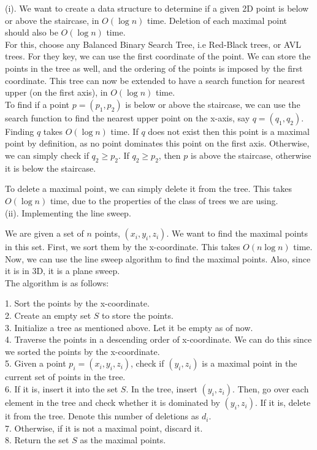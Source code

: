 \documentclass[a4paper]{article}
\begin{document}
\begin{enumerate}
    (i). We want to create a data structure to determine if a given 2D point is below or above the staircase, in $O(\log n)$ time. Deletion of each maximal point should also be $O(\log n)$ time.\\
    For this, choose any Balanced Binary Search Tree, i.e Red-Black trees, or AVL trees. For they key, we can use the first coordinate of the point. We can store the points in the tree as well, and the ordering of the points is imposed by the first coordinate. This tree can now be extended to have a search function for nearest upper (on the first axis), in $O(\log n)$ time.\\

    To find if a point $p = (p_1, p_2)$ is below or above the staircase, we can use the search function to find the nearest upper point on the x-axis, say $q = (q_1, q_2)$. Finding $q$ takes $O(\log n)$ time. If $q$ does not exist then this point is a maximal point by definition, as no point dominates this point on the first axis. Otherwise, we can simply check if $q_2 \geq p_2$. If $q_2 \geq p_2$, then $p$ is above the staircase, otherwise it is below the staircase.

    To delete a maximal point, we can simply delete it from the tree. This takes $O(\log n)$ time, due to the properties of the class of trees we are using.\\

    (ii). Implementing the line sweep.

    We are given a set of $n$ points, $(x_i, y_i, z_i)$. We want to find the maximal points in this set. First, we sort them by the x-coordinate. This takes $O(n \log n)$ time. Now, we can use the line sweep algorithm to find the maximal points. Also, since it is in 3D, it is a plane sweep.\\
    
    The algorithm is as follows:

    1. Sort the points by the x-coordinate.\\
    2. Create an empty set $S$ to store the points.\\
    3. Initialize a tree as mentioned above. Let it be empty as of now.\\
    4. Traverse the points in a descending order of x-coordinate. We can do this since we sorted the points by the x-coordinate.\\
    5. Given a point $p_i = (x_i, y_i, z_i)$, check if $(y_i, z_i)$ is a maximal point in the current set of points in the tree.\\
    6. If it is, insert it into the set $S$. In the tree, insert $(y_i, z_i)$. Then, go over each element in the tree and check whether it is dominated by $(y_i, z_i)$. If it is, delete it from the tree. Denote this number of deletions as $d_i$.\\
    7. Otherwise, if it is not a maximal point, discard it.\\
    8. Return the set $S$ as the maximal points.\\


\end{enumerate}
\end{document}
